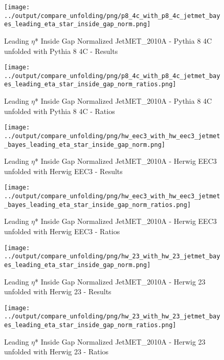 \documentclass[11pt]{book}
\begin{document}
\begin{figure}[ht]
\centering
\texttt{[image: ../output/compare\_unfolding/png/p8\_4c\_with\_p8\_4c\_jetmet\_bayes\_leading\_eta\_star\_inside\_gap\_norm.png]}
\caption{Leading $\eta$* Inside Gap Normalized JetMET\_2010A - Pythia 8 4C unfolded with Pythia 8 4C - Results}
\label{p8_p8_jetmet_bayes_leading_eta_star_inside_gap_norm_a}
\end{figure}

\begin{figure}[ht]
\centering
\texttt{[image: ../output/compare\_unfolding/png/p8\_4c\_with\_p8\_4c\_jetmet\_bayes\_leading\_eta\_star\_inside\_gap\_norm\_ratios.png]}
\caption{Leading $\eta$* Inside Gap Normalized JetMET\_2010A - Pythia 8 4C unfolded with Pythia 8 4C - Ratios}
\label{p8_p8_jetmet_bayes_leading_eta_star_inside_gap_norm_b}
\end{figure}

\begin{figure}[ht]
\centering
\texttt{[image: ../output/compare\_unfolding/png/hw\_eec3\_with\_hw\_eec3\_jetmet\_bayes\_leading\_eta\_star\_inside\_gap\_norm.png]}
\caption{Leading $\eta$* Inside Gap Normalized JetMET\_2010A - Herwig EEC3 unfolded with Herwig EEC3 - Results}
\label{hw_eec3_hw_eec3_jetmet_bayes_leading_eta_star_inside_gap_norm_a}
\end{figure}

\begin{figure}[ht]
\centering
\texttt{[image: ../output/compare\_unfolding/png/hw\_eec3\_with\_hw\_eec3\_jetmet\_bayes\_leading\_eta\_star\_inside\_gap\_norm\_ratios.png]}
\caption{Leading $\eta$* Inside Gap Normalized JetMET\_2010A - Herwig EEC3 unfolded with Herwig EEC3 - Ratios}
\label{hw_eec3_hw_eec3_jetmet_bayes_leading_eta_star_inside_gap_norm_b}
\end{figure}

\begin{figure}[ht]
\centering
\texttt{[image: ../output/compare\_unfolding/png/hw\_23\_with\_hw\_23\_jetmet\_bayes\_leading\_eta\_star\_inside\_gap\_norm.png]}
\caption{Leading $\eta$* Inside Gap Normalized JetMET\_2010A - Herwig 23 unfolded with Herwig 23 - Results}
\label{hw_23_hw_23_jetmet_bayes_leading_eta_star_inside_gap_norm_a}
\end{figure}

\begin{figure}[ht]
\centering
\texttt{[image: ../output/compare\_unfolding/png/hw\_23\_with\_hw\_23\_jetmet\_bayes\_leading\_eta\_star\_inside\_gap\_norm\_ratios.png]}
\caption{Leading $\eta$* Inside Gap Normalized JetMET\_2010A - Herwig 23 unfolded with Herwig 23 - Ratios}
\label{hw_23_hw_23_jetmet_bayes_leading_eta_star_inside_gap_norm_b}
\end{figure}
\end{document}

